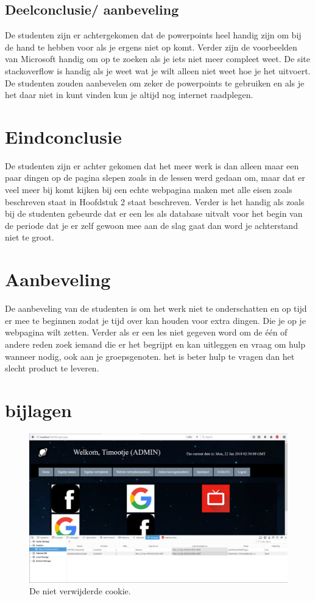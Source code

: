 \documentclass[11pt]{article}
\begin{document}
	\subsection{Deelconclusie/ aanbeveling}
	De studenten zijn er achtergekomen dat de powerpoints heel handig zijn om bij de hand te hebben voor als je ergens niet op komt. Verder zijn de voorbeelden van Microsoft handig om op te zoeken als je iets niet meer compleet weet. De site stackoverflow is handig als je weet wat je wilt alleen niet weet hoe je het uitvoert. De studenten zouden aanbevelen om zeker de powerpoints te gebruiken en als je het daar niet in kunt vinden kun je altijd nog internet raadplegen. 
	\newpage
	
	\section{Eindconclusie}
	De studenten zijn er achter gekomen dat het meer werk is dan alleen maar een paar dingen op de pagina slepen zoals in de lessen werd gedaan om, maar dat er veel meer bij komt kijken bij een echte webpagina maken met alle eisen zoals beschreven staat in Hoofdstuk 2 staat beschreven. Verder is het handig als zoals bij de studenten gebeurde dat er een les als database uitvalt voor het begin van de periode dat je er zelf gewoon mee aan de slag gaat dan word je achterstand niet te groot.
	
	
	\section{Aanbeveling}
	De aanbeveling van de studenten is om het werk niet te onderschatten en op tijd er mee te beginnen zodat je tijd over kan houden voor extra dingen. Die je op je webpagina wilt zetten. Verder als er een les niet gegeven word om de één of andere reden zoek iemand die er het begrijpt en kan uitleggen en vraag om hulp wanneer nodig, ook aan je groepsgenoten. het is beter hulp te vragen dan het slecht product te leveren.  
	
	\newpage
	
	\section{bijlagen}
	
	\begin{figure}[h]
		\centering
		\includegraphics[width=\textwidth]{cookie}
		\caption{De niet verwijderde cookie.}
		\label{Cookie}
	\end{figure}
\end{document}
